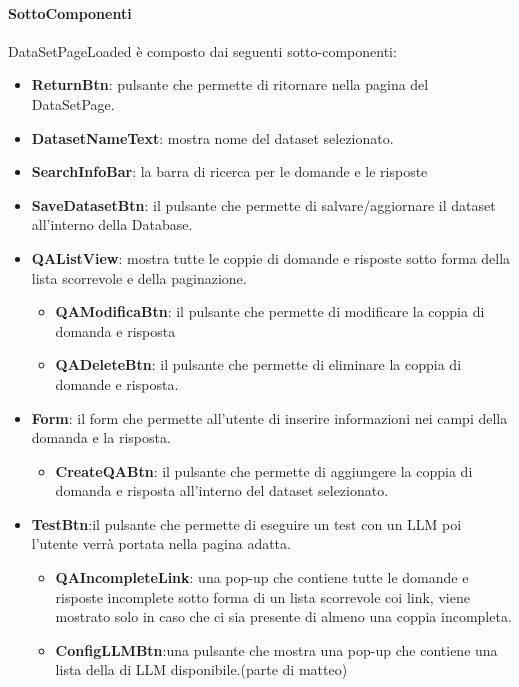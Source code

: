\paragraph{SottoComponenti}
DataSetPageLoaded è composto dai seguenti sotto-componenti:
\begin{itemize}
        \item \textbf{ReturnBtn}: pulsante che permette di ritornare nella pagina del DataSetPage.
        \item \textbf{DatasetNameText}: mostra nome del dataset selezionato.
        \item \textbf{SearchInfoBar}: la barra di ricerca per le domande e le risposte
        \item \textbf{SaveDatasetBtn}: il pulsante che permette di salvare/aggiornare il dataset all'interno della Database.
        \item \textbf{QAListView}: mostra tutte le coppie di domande e risposte sotto forma della lista scorrevole e della paginazione.
        \begin{itemize}
            \item \textbf{QAModificaBtn}: il pulsante che permette di modificare la coppia di domanda e risposta
            \item \textbf{QADeleteBtn}: il pulsante che permette di eliminare la coppia di domande e risposta.
        \end{itemize}

        \item \textbf{Form}: il form che permette all'utente di inserire informazioni nei campi della domanda e la risposta. 
        \begin{itemize}
            \item \textbf{CreateQABtn}: il pulsante che permette di aggiungere la coppia di domanda e risposta all'interno del dataset selezionato.
        \end{itemize}

        \item \textbf{TestBtn}:il pulsante che permette di eseguire un test con un LLM poi l'utente verrà portata nella pagina adatta.
        \begin{itemize}
            \item \textbf{QAIncompleteLink}: una pop-up che contiene tutte le domande e risposte incomplete sotto forma di un lista scorrevole coi link, viene mostrato solo in caso che ci sia presente di almeno una coppia incompleta.
            \item \textbf{ConfigLLMBtn}:una pulsante che mostra una pop-up che contiene una lista della di LLM disponibile.(parte di matteo)
        \end{itemize}

    \end{itemize}

